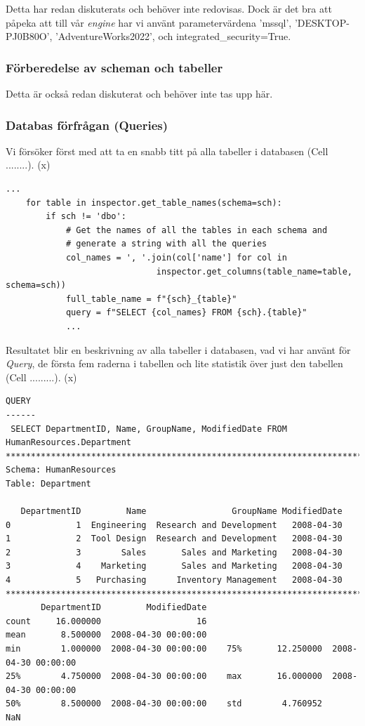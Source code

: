 \documentclass[]{article}
\begin{document}
Detta har redan diskuterats och behöver inte redovisas. Dock är det bra att påpeka att till vår \emph{engine} har vi använt parametervärdena 'mssql', 'DESKTOP-PJ0B80O', 'AdventureWorks2022', och integrated\_security=True.

\subsubsection{Förberedelse av scheman och tabeller}
 
 Detta är också redan diskuterat och behöver inte tas upp här.

\subsubsection{Databas förfrågan (Queries)}

Vi försöker först med att ta en snabb titt på alla tabeller i databasen (Cell ........).
\if(x)
\begin{lstlisting}
...
    for table in inspector.get_table_names(schema=sch):
        if sch != 'dbo':
            # Get the names of all the tables in each schema and
            # generate a string with all the queries
            col_names = ', '.join(col['name'] for col in 
            			      inspector.get_columns(table_name=table, schema=sch))
            full_table_name = f"{sch}_{table}"
            query = f"SELECT {col_names} FROM {sch}.{table}"
            ...
\end{lstlisting}
\fi
Resultatet blir en beskrivning av alla tabeller i databasen, vad vi har använt för \emph{Query}, de första fem raderna i tabellen och lite statistik över just den tabellen (Cell .........).
\if(x)
\begin{lstlisting}
QUERY
------
 SELECT DepartmentID, Name, GroupName, ModifiedDate FROM HumanResources.Department 
*************************************************************************
Schema: HumanResources
Table: Department

   DepartmentID         Name                 GroupName ModifiedDate
0             1  Engineering  Research and Development   2008-04-30
1             2  Tool Design  Research and Development   2008-04-30
2             3        Sales       Sales and Marketing   2008-04-30
3             4    Marketing       Sales and Marketing   2008-04-30
4             5   Purchasing      Inventory Management   2008-04-30
*************************************************************************
       DepartmentID         ModifiedDate
count     16.000000                   16
mean       8.500000  2008-04-30 00:00:00
min        1.000000  2008-04-30 00:00:00	75%       12.250000  2008-04-30 00:00:00
25%        4.750000  2008-04-30 00:00:00	max       16.000000  2008-04-30 00:00:00
50%        8.500000  2008-04-30 00:00:00	std        4.760952                  NaN
\end{lstlisting}
\fi
\end{document}
